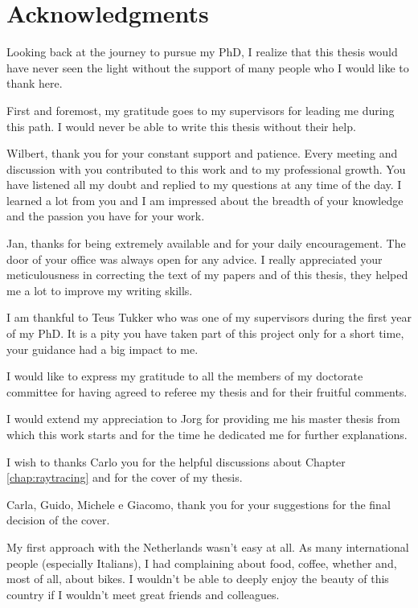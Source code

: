 \clearpage{\pagestyle{empty}\cleardoublepage}

\chapter*{Acknowledgments}
\markboth{}{}
Looking back at the journey to pursue my PhD, I realize that this thesis would have never seen the light without the support of many people who I would like to thank here.  

First and foremost, my gratitude goes to my supervisors for leading me during this path. I would never be able to write this thesis without their help.

Wilbert, thank you for your constant support and patience. Every meeting and discussion with you contributed to this work and to my professional growth. 
You have listened all my doubt and replied to my questions at any time of the day.
I learned a lot from you and I am impressed about the breadth of your knowledge and the passion you have for your work. 

Jan, thanks for being extremely available and for your daily encouragement. The door of your office was always open for any advice. 
I really appreciated your meticulousness in correcting the text of my papers and of this thesis, they helped me a lot to improve my writing skills.

I am thankful to Teus Tukker who was one of my supervisors during the first year of my PhD. It is a pity you have taken part of this project only for a short time, your guidance had a big impact to me.

I would like to express my gratitude to all the members of my doctorate committee for having agreed to referee my thesis and for their fruitful comments.  

I would extend my appreciation to Jorg for providing me his master thesis from which this work starts and for the time he dedicated me for further explanations.

I wish to thanks Carlo you for the helpful discussions about Chapter \ref{chap:raytracing} and for the cover of my thesis. 

Carla, Guido, Michele e Giacomo, thank you for your suggestions for the final decision of the cover.

My first approach with the Netherlands wasn't easy at all. As many international people (especially Italians), I had complaining about food, coffee, whether and, most of all, about bikes. 
I wouldn't be able to deeply enjoy the beauty of this country if I wouldn't meet great friends and colleagues.

